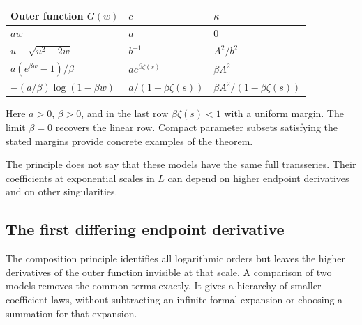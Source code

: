 \begin{center}
\begin{tabular}{@{}lll@{}}
\toprule
Outer function $G(w)$ & $c$ & $\kappa$\\
\midrule
$a w$ & $a$ & $0$\\
$u-\sqrt{u^2-2w}$ & $b^{-1}$ & $A^2/b^2$\\
$a(e^{\beta w}-1)/\beta$ & $a e^{\beta\zeta(s)}$ & $\beta A^2$\\
$-(a/\beta)\log(1-\beta w)$ & $a/(1-\beta\zeta(s))$
 & $\beta A^2/(1-\beta\zeta(s))$\\
\bottomrule
\end{tabular}
\end{center}
Here $a>0$, $\beta>0$, and in the last row
$\beta\zeta(s)<1$ with a uniform margin. The limit $\beta=0$
recovers the linear row. Compact parameter subsets satisfying the
stated margins provide concrete examples of the theorem.

The principle does not say that these models have the same full
transseries. Their coefficients at exponential scales in $L$ can
depend on higher endpoint derivatives and on other singularities.

\subsection{The first differing endpoint derivative}
\label{jct:sec:matched-jets}

The composition principle identifies all logarithmic orders but leaves
the higher derivatives of the outer function invisible at that scale.
A comparison of two models removes the common terms exactly. It gives
a hierarchy of smaller coefficient laws, without subtracting an infinite
formal expansion or choosing a summation for that expansion.

